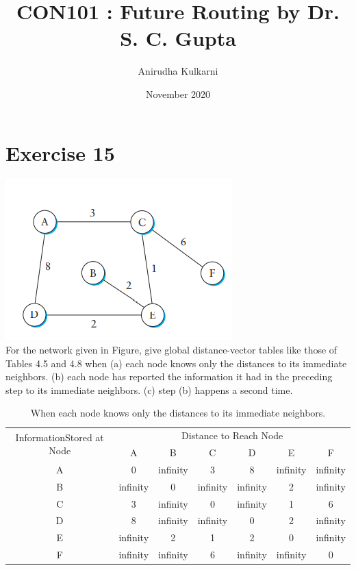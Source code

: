 \documentclass{article}
\title{CON101 : Future Routing by Dr. S. C. Gupta}
\author{Anirudha Kulkarni}
\date{November 2020}
\begin{document}
\maketitle
\section{Exercise 15}
\includegraphics[center]{Assignment-4/ques.png}\\
For the network given in Figure, give global distance-vector tables like those
of Tables 4.5 and 4.8 when
(a) each node knows only the distances to its immediate neighbors.
(b) each node has reported the information it had in the preceding step to its
immediate neighbors.
(c) step (b) happens a second time.
\begin{table}[hbt]
\caption{When each node knows only the distances to its immediate neighbors.}
\centering
\begin{tabular}{|c|c|c|c|c|c|c|} 
\hline
\multirow{2}{*}{InformationStored at Node} & \multicolumn{6}{c|}{Distance to Reach Node}                      \\ 
\cline{2-7}
                                           & A        & B        & C        & D        & E        & F         \\ 
\hline
A                                          & 0        & infinity & 3        & 8        & infinity & infinity  \\ 
\hline
B                                          & infinity & 0        & infinity & infinity & 2        & infinity  \\ 
\hline
C                                          & 3        & infinity & 0        & infinity & 1        & 6         \\ 
\hline
D                                          & 8        & infinity & infinity & 0        & 2        & infinity  \\ 
\hline
E                                          & infinity & 2        & 1        & 2        & 0        & infinity  \\ 
\hline
F                                          & infinity & infinity & 6        & infinity & infinity & 0         \\
\hline
\end{tabular}
\end{table}
\end{document}
